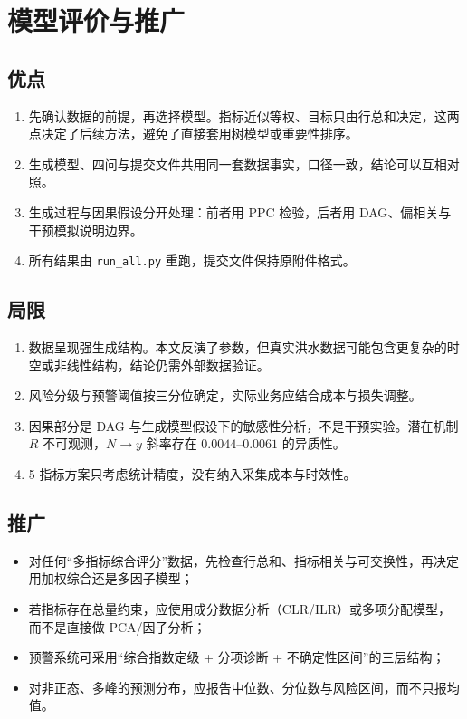\documentclass[12pt,a4paper]{ctexart}
\begin{document}
\section{模型评价与推广}

\subsection{优点}
\begin{enumerate}
  \item 先确认数据的前提，再选择模型。指标近似等权、目标只由行总和决定，这两点决定了后续方法，避免了直接套用树模型或重要性排序。
  \item 生成模型、四问与提交文件共用同一套数据事实，口径一致，结论可以互相对照。
  \item 生成过程与因果假设分开处理：前者用 PPC 检验，后者用 DAG、偏相关与干预模拟说明边界。
  \item 所有结果由 \texttt{run\_all.py} 重跑，提交文件保持原附件格式。
\end{enumerate}

\subsection{局限}
\begin{enumerate}
  \item 数据呈现强生成结构。本文反演了参数，但真实洪水数据可能包含更复杂的时空或非线性结构，结论仍需外部数据验证。
  \item 风险分级与预警阈值按三分位确定，实际业务应结合成本与损失调整。
  \item 因果部分是 DAG 与生成模型假设下的敏感性分析，不是干预实验。潜在机制 \(R\) 不可观测，\(N\to y\) 斜率存在 \(0.0044\)–\(0.0061\) 的异质性。
  \item 5 指标方案只考虑统计精度，没有纳入采集成本与时效性。
\end{enumerate}

\subsection{推广}
\begin{itemize}
  \item 对任何“多指标综合评分”数据，先检查行总和、指标相关与可交换性，再决定用加权综合还是多因子模型；
  \item 若指标存在总量约束，应使用成分数据分析（CLR/ILR）或多项分配模型，而不是直接做 PCA/因子分析；
  \item 预警系统可采用“综合指数定级 + 分项诊断 + 不确定性区间”的三层结构；
  \item 对非正态、多峰的预测分布，应报告中位数、分位数与风险区间，而不只报均值。
\end{itemize}
\end{document}
